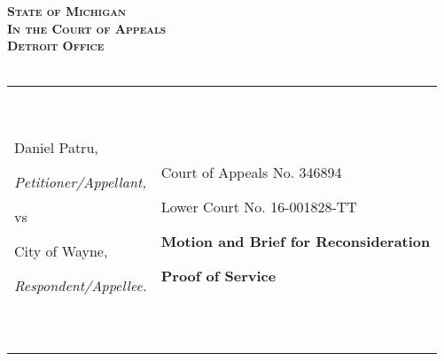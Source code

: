 \documentclass[12pt,\documentclassflag]{michiganCourtOfAppealsBrief}
\begin{document}
\begin{centering}
\bf\scshape State of Michigan\\In the Court of Appeals\\Detroit Office\\~\\ 
\rm 

\makeandtab
\setlength{\tabcolsep}{20pt}%
\begin{tabular}{p{} p{}}
\cline{1-2}
  {~

  \raggedright Daniel Patru,\par
  \hfill\textit{Petitioner/Appellant,}
  \vspace{.5\baselineskip}\par
  vs\par
  \vspace{.5\baselineskip}
  \raggedright City of Wayne,\par
  \hfill\textit{Respondent/Appellee.}
  
  ~} &  {~
       \par\par
       \hfill Court of Appeals No. 346894\par
       \hfill Lower Court No. 16-001828-TT\par\vspace{\baselineskip}

       \hfill \raggedleft\textbf{Motion and Brief for Reconsideration}\vspace{.5\baselineskip}\par
       \hfill \textbf{Proof of Service}\newline      
  ~}
  \\ \cline{1-2}\vspace{2mm}
  
       

\end{tabular}
\end{centering}
\end{document}
